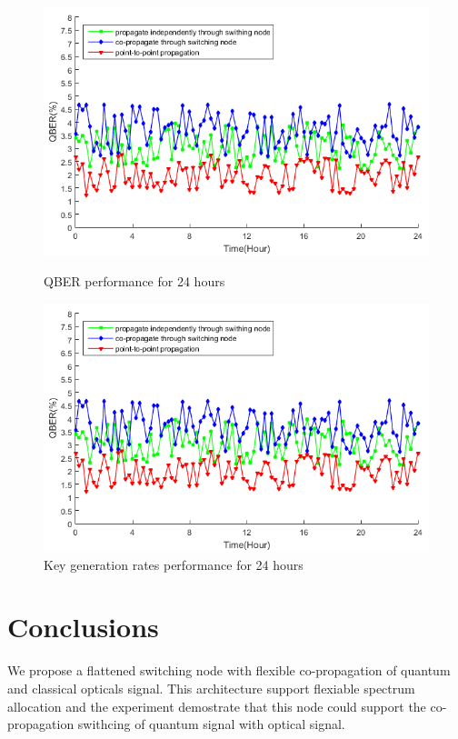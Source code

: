 \documentclass[letterpaper,10pt]{article}
\begin{document}
\begin{figure}[!htb]
   \begin{minipage}{0.48\textwidth}
     \centering
     \includegraphics[width=.9\linewidth]{qber_experiment}
     \caption{QBER performance for 24 hours} \label{Fig:comparison_of_loss}
   \end{minipage}\hfill
   \begin{minipage}{0.48\textwidth}
     \centering
     \includegraphics[width=.9\linewidth]{qber_experiment}
     \caption{Key generation rates performance for 24 hours} \label{Fig:comparison_of_rate}
   \end{minipage}
\end{figure}

\section{Conclusions}
We propose a flattened switching node with flexible co-propagation of quantum and classical opticals signal. This architecture support flexiable spectrum allocation and the experiment demostrate that this node could support the co-propagation swithcing of quantum signal with optical signal.
\end{document}
